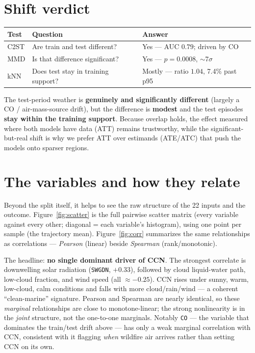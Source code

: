 \documentclass[11pt]{article}
\begin{document}
\section*{Shift verdict}
\begin{center}
\begin{tabular}{lll}
\hline
\textbf{Test} & \textbf{Question} & \textbf{Answer} \\
\hline
C2ST & Are train and test different? & Yes --- AUC $0.79$; driven by CO \\
MMD  & Is that difference significant? & Yes --- $p = 0.0008$, $\sim$7$\sigma$ \\
kNN  & Does test stay in training support? & Mostly --- ratio $1.04$, 7.4\% past p95 \\
\hline
\end{tabular}
\end{center}
The test-period weather is \textbf{genuinely and significantly different} (largely a
CO / air-mass-source drift), but the difference is \textbf{modest} and the test
episodes \textbf{stay within the training support}. Because overlap holds, the effect
measured where both models have data (ATT) remains trustworthy, while the
significant-but-real shift is why we prefer ATT over estimands (ATE/ATC) that push the
models onto sparser regions.

\section*{The variables and how they relate}
Beyond the split itself, it helps to see the raw structure of the 22 inputs and the
outcome. Figure~\ref{fig:scatter} is the full pairwise scatter matrix (every variable
against every other; diagonal = each variable's histogram), using one point per sample
(the trajectory mean). Figure~\ref{fig:corr} summarizes the same relationships as
correlations --- \emph{Pearson} (linear) beside \emph{Spearman} (rank/monotonic).

The headline: \textbf{no single dominant driver of CCN}. The strongest correlate is
downwelling solar radiation (\texttt{SWGDN}, $+0.33$), followed by cloud liquid-water
path, low-cloud fraction, and wind speed (all $\approx-0.25$). CCN rises under sunny,
warm, low-cloud, calm conditions and falls with more cloud/rain/wind --- a coherent
``clean-marine'' signature. Pearson and Spearman are nearly identical, so these
\emph{marginal} relationships are close to monotone-linear; the strong nonlinearity is
in the \emph{joint} structure, not the one-to-one marginals. Notably \texttt{CO} --- the
variable that dominates the train/test drift above --- has only a weak marginal
correlation with CCN, consistent with it flagging \emph{when} wildfire air arrives
rather than setting CCN on its own.
\end{document}
